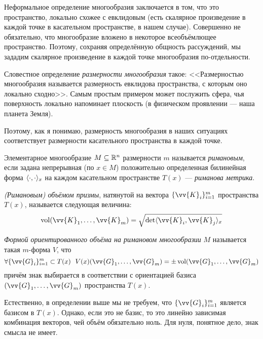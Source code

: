 \begin{anote}
	Неформальное определение многообразия заключается в том, что это пространство, локально схожее с евклидовым (есть скалярное произведение в каждой точке в касательном пространстве, в нашем случае). Совершенно не обязательно, что многообразие вложено в некоторое всеобъёмлющее пространство. Поэтому, сохраняя определённую общность рассуждений, мы зададим скалярное произведение в каждой точке многообразия по-отдельности.
	
	Словестное определение \textit{размерности многообразия} такое: <<Размерностью многообразия называется размерность евклидова пространства, с которым оно локально сходно>>. Самым простым примером может послужить сфера, чья поверхность локально напоминает плоскость (в физическом проявлении --- наша планета Земля).
	
	Поэтому, как я понимаю, размерность многообразия в наших ситуациях соответствует размерности касательного пространства в каждой точке.
\end{anote}

\begin{definition}
	Элементарное многообразие $M \subseteq \mathbb{R}^n$ размерности $m$ называется \textit{римановым}, если задана непрерывная (по $x \in M$) положительно определенная билинейная форма $\langle\cdot, \cdot\rangle_x$ на каждом касательном пространстве $T(x)$ --- \textit{риманова метрика}.
\end{definition}

\begin{definition}
	\textit{(Римановым) объёмом призмы}, натянутой на вектора $\{\vv{K}_i\}_{i = 1}^m$ пространства $T(x)$, называется следующая величина:
	\[
		\vol(\vv{K}_1, \ldots, \vv{K}_m) = \sqrt{\det\ntbr{\vv{K}_i, \vv{K}_j}_x}
	\]
\end{definition}

\begin{definition}
	\textit{Формой ориентированного объёма на римановом многообразии} $M$ называется такая $m$-форма $V$, что
	\[
		\forall \{\vv{G}_i\}_{i = 1}^m \subset T(x)\ \ V(x)(\vv{G}_1, \ldots, \vv{G}_m) = \pm \vol(\vv{G}_1, \ldots, \vv{G}_m)
	\]
	причём знак выбирается в соответствии с ориентацией базиса $(\vv{G}_1, \ldots, \vv{G}_m)$ пространства $T(x)$.
\end{definition}

\begin{anote}
	Естественно, в определении выше мы не требуем, что $\{\vv{G}_i\}_{i = 1}^m$ является базисом в $T(x)$. Однако, если это не базис, то это линейно зависимая комбинация векторов, чей объём обязательно ноль. Для нуля, понятное дело, знак смысла не имеет.
\end{anote}

